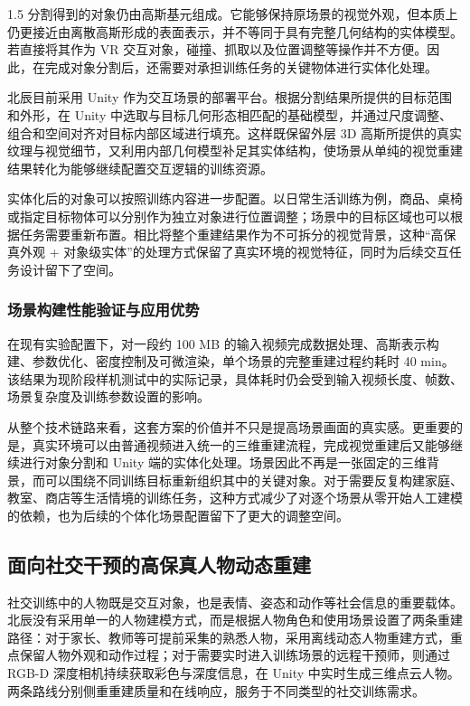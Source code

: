 \documentclass[zihao=-4]{ctexart}
\begin{document}
\begin{spacing}{1.5}
分割得到的对象仍由高斯基元组成。它能够保持原场景的视觉外观，但本质上仍更接近由离散高斯形成的表面表示，并不等同于具有完整几何结构的实体模型。若直接将其作为 VR 交互对象，碰撞、抓取以及位置调整等操作并不方便。因此，在完成对象分割后，还需要对承担训练任务的关键物体进行实体化处理。

北辰目前采用 Unity 作为交互场景的部署平台。根据分割结果所提供的目标范围和外形，在 Unity 中选取与目标几何形态相匹配的基础模型，并通过尺度调整、组合和空间对齐对目标内部区域进行填充。这样既保留外层 3D 高斯所提供的真实纹理与视觉细节，又利用内部几何模型补足其实体结构，使场景从单纯的视觉重建结果转化为能够继续配置交互逻辑的训练资源。

实体化后的对象可以按照训练内容进一步配置。以日常生活训练为例，商品、桌椅或指定目标物体可以分别作为独立对象进行位置调整；场景中的目标区域也可以根据任务需要重新布置。相比将整个重建结果作为不可拆分的视觉背景，这种“高保真外观 + 对象级实体”的处理方式保留了真实环境的视觉特征，同时为后续交互任务设计留下了空间。

\subsubsection{场景构建性能验证与应用优势}

在现有实验配置下，对一段约 100 MB 的输入视频完成数据处理、高斯表示构建、参数优化、密度控制及可微渲染，单个场景的完整重建过程约耗时 40 min。该结果为现阶段样机测试中的实际记录，具体耗时仍会受到输入视频长度、帧数、场景复杂度及训练参数设置的影响。

从整个技术链路来看，这套方案的价值并不只是提高场景画面的真实感。更重要的是，真实环境可以由普通视频进入统一的三维重建流程，完成视觉重建后又能够继续进行对象分割和 Unity 端的实体化处理。场景因此不再是一张固定的三维背景，而可以围绕不同训练目标重新组织其中的关键对象。对于需要反复构建家庭、教室、商店等生活情境的训练任务，这种方式减少了对逐个场景从零开始人工建模的依赖，也为后续的个体化场景配置留下了更大的调整空间。


\subsection{面向社交干预的高保真人物动态重建}

社交训练中的人物既是交互对象，也是表情、姿态和动作等社会信息的重要载体。北辰没有采用单一的人物建模方式，而是根据人物角色和使用场景设置了两条重建路径：对于家长、教师等可提前采集的熟悉人物，采用离线动态人物重建方式，重点保留人物外观和动作过程；对于需要实时进入训练场景的远程干预师，则通过 RGB-D 深度相机持续获取彩色与深度信息，在 Unity 中实时生成三维点云人物。两条路线分别侧重重建质量和在线响应，服务于不同类型的社交训练需求。


\end{spacing}
\end{document}

